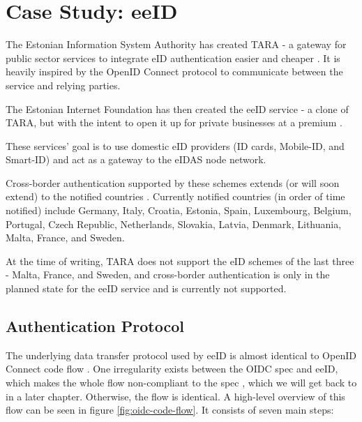 \section{Case Study: eeID}

The Estonian Information System Authority has created TARA - a gateway for public sector services to integrate eID authentication easier and cheaper \cite{tara-business}. It is heavily inspired by the OpenID Connect \cite{tara-technical} protocol to communicate between the service and relying parties.

The Estonian Internet Foundation has then created the eeID service - a clone of TARA, but with the intent to open it up for private businesses at a premium \cite{eeid}.

These services' goal is to use domestic eID providers (ID cards, Mobile-ID, and Smart-ID) and act as a gateway to the eIDAS node network.

Cross-border authentication supported by these schemes extends (or will soon extend) to the notified countries \cite{eulaw-eidas-notified}. Currently notified countries (in order of time notified) include Germany, Italy, Croatia, Estonia, Spain, Luxembourg, Belgium, Portugal, Czech Republic, Netherlands, Slovakia, Latvia, Denmark, Lithuania, Malta, France, and Sweden.

At the time of writing, TARA does not support the eID schemes of the last three - Malta, France, and Sweden, and cross-border authentication is only in the planned state for the eeID service and is currently not supported.

\subsection{Authentication Protocol}

The underlying data transfer protocol used by eeID is almost identical to OpenID Connect code flow \cite{tara-technical, oidc}. One irregularity exists between the OIDC spec and eeID, which makes the whole flow non-compliant to the spec \cite{tara-non-oidc-compliant}, which we will get back to in a later chapter. Otherwise, the flow is identical. A high-level overview of this flow can be seen in figure \ref{fig:oidc-code-flow}. It consists of seven main steps:

